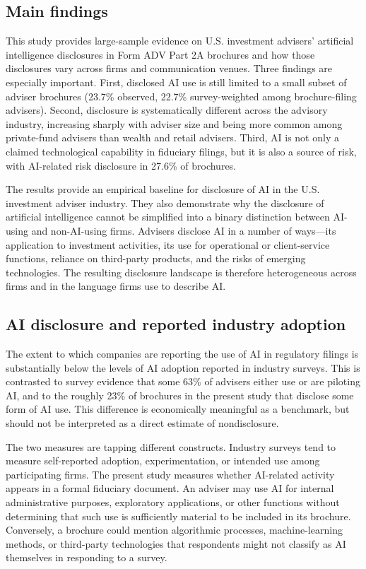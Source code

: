 \documentclass[utf8]{FrontiersinHarvard}
\begin{document}
\subsection{Main findings}

This study provides large-sample evidence on U.S. investment advisers' artificial intelligence disclosures in Form ADV Part 2A brochures and how those disclosures vary across firms and communication venues. Three findings are especially important. First, disclosed AI use is still limited to a small subset of adviser brochures (23.7\% observed, 22.7\% survey-weighted among brochure-filing advisers). Second, disclosure is systematically different across the advisory industry, increasing sharply with adviser size and being more common among private-fund advisers than wealth and retail advisers. Third, AI is not only a claimed technological capability in fiduciary filings, but it is also a source of risk, with AI-related risk disclosure in 27.6\% of brochures.

The results provide an empirical baseline for disclosure of AI in the U.S. investment adviser industry. They also demonstrate why the disclosure of artificial intelligence cannot be simplified into a binary distinction between AI-using and non-AI-using firms. Advisers disclose AI in a number of ways---its application to investment activities, its use for operational or client-service functions, reliance on third-party products, and the risks of emerging technologies. The resulting disclosure landscape is therefore heterogeneous across firms and in the language firms use to describe AI.

\subsection{AI disclosure and reported industry adoption}

The extent to which companies are reporting the use of AI in regulatory filings is substantially below the levels of AI adoption reported in industry surveys. This is contrasted to survey evidence that some 63\% of advisers either use or are piloting AI, and to the roughly 23\% of brochures in the present study that disclose some form of AI use. This difference is economically meaningful as a benchmark, but should not be interpreted as a direct estimate of nondisclosure.

The two measures are tapping different constructs. Industry surveys tend to measure self-reported adoption, experimentation, or intended use among participating firms. The present study measures whether AI-related activity appears in a formal fiduciary document. An adviser may use AI for internal administrative purposes, exploratory applications, or other functions without determining that such use is sufficiently material to be included in its brochure. Conversely, a brochure could mention algorithmic processes, machine-learning methods, or third-party technologies that respondents might not classify as AI themselves in responding to a survey.
\end{document}

